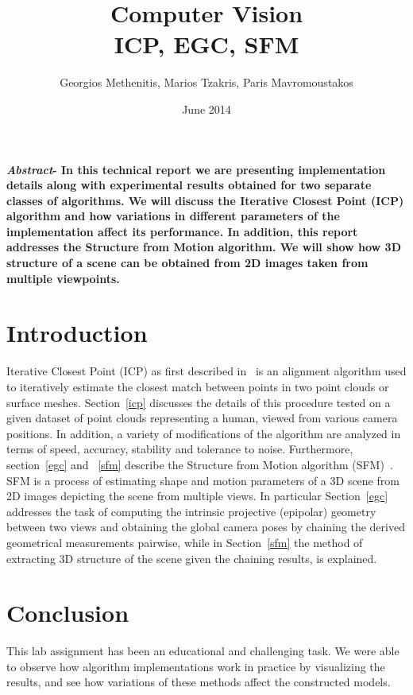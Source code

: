 \documentclass[11pt,twocolumn]{article}
\title{Computer Vision\\ICP, EGC, SFM}
\author{Georgios Methenitis, Marios Tzakris, Paris Mavromoustakos}
\affil{University of Amsterdam}
\date{June 2014}
\begin{document}
\maketitle

\renewcommand{\labelenumi}{\alph{enumi}.}



\textbf{\textit{Abstract}- In this technical report we are presenting implementation details along with experimental results obtained for two separate classes of algorithms. We will discuss the Iterative Closest Point (ICP) algorithm and how variations in different parameters of the implementation affect its performance. In addition, this report addresses the Structure from Motion algorithm. We will show how 3D structure of a scene can be obtained from 2D images taken from multiple viewpoints.}


\section{Introduction}
\label{introduction}
Iterative Closest Point (ICP) as first described in~\cite{icp} is an alignment algorithm used to iteratively estimate the closest match between points in two point clouds or surface meshes. Section~\ref{icp} discusses the details of this procedure tested on a given dataset of point clouds representing a human, viewed from various camera positions. In addition, a variety of modifications of the algorithm are analyzed in terms of speed, accuracy, stability and tolerance to noise.
Furthermore, section~\ref{egc} and ~\ref{sfm} describe the Structure from Motion algorithm (SFM)~\cite{egc}. SFM is a process of estimating shape and motion parameters of a 3D scene from 2D images depicting the scene from multiple views. In particular Section~\ref{egc} addresses the task of computing the intrinsic projective (epipolar) geometry between two views and obtaining the global camera poses by chaining the derived geometrical measurements pairwise, while in Section~\ref{sfm} the method of extracting 3D structure of the scene given the chaining results, is explained.











\section{Conclusion}

This lab assignment has been an educational and challenging task. We were able to observe how algorithm implementations work in practice by visualizing the results, and see how variations of these methods affect the constructed models.
\end{document}
